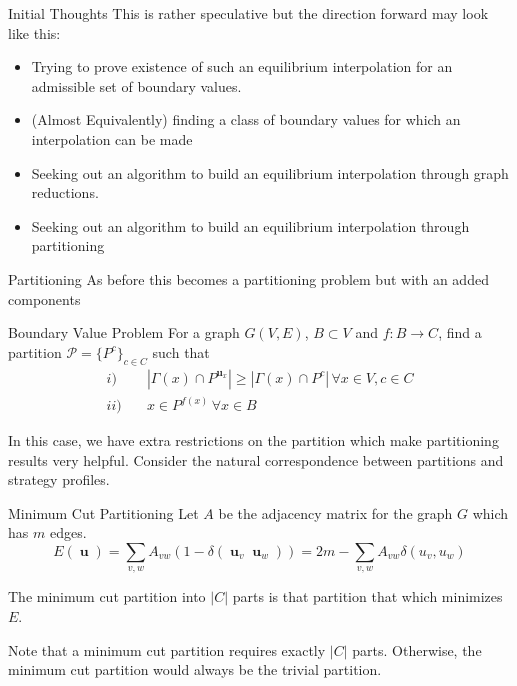 \documentclass{beamer}
\DeclareMathOperator{\uu}{\mathbf{u}}
\begin{document}
\begin{frame}{Initial Thoughts}
	This is rather speculative but the direction forward may look like this:
	\begin{itemize}
		\item Trying to prove existence of such an equilibrium interpolation for an admissible set of boundary values. 
		\item (Almost Equivalently) finding a class of boundary values for which an interpolation can be made
		\item Seeking out an algorithm to build an equilibrium interpolation through graph reductions.  
		\item Seeking out an algorithm to build an equilibrium interpolation through partitioning
	\end{itemize}
\end{frame}
\begin{frame}{Partitioning}
	As before this becomes a partitioning problem but with an added components
	\begin{block}{Boundary Value Problem }
		For a graph $G(V,E)$, $B\subset V$ and $f:B\rightarrow C$, find a partition $\mathcal{P}=\{P^{c}\}_{c\in C}$ such that 
		\begin{equation}
			\begin{split}
				i)\quad & |\Gamma(x)\cap P^{\uu_x}|\geq |\Gamma(x)\cap P^{c}|\,\forall x\in V, c\in C \\
				ii)\quad &  x\in P^{f(x)}\,\forall x\in B 
			\end{split}
		\end{equation}
	\end{block}
	In this case, we have extra restrictions on the partition which make partitioning results very helpful. Consider the natural correspondence between partitions and strategy profiles.
\end{frame}

\begin{frame}{Minimum Cut Partitioning}
	Let $A$ be the adjacency matrix for the graph $G$ which has $m$ edges. 
	\begin{equation}
		E(\uu) = \sum_{v,w}A_{vw}(1-\delta(\uu_v\uu_w))= 2m-\sum_{v,w}A_{vw}\delta(u_v,u_w)	\end{equation}
	
	The minimum cut partition into $|C|$ parts is that partition that which minimizes $E$. 
	
	Note that a minimum cut partition requires exactly $|C|$ parts. Otherwise, the minimum cut partition would always be the trivial partition. 
\end{frame}
\end{document}
